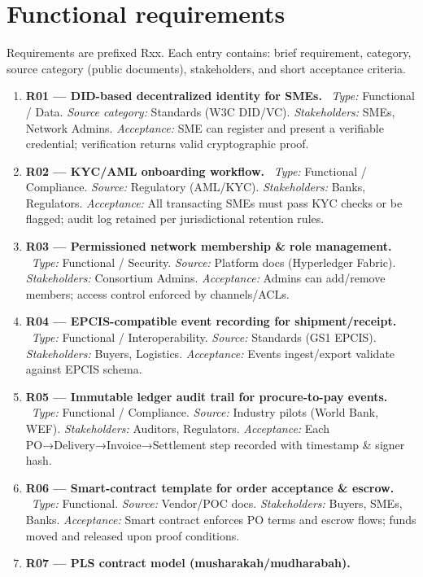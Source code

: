 \documentclass[11pt,a4paper]{article}
\begin{document}
\section{Functional requirements}
\label{sec:functional}
Requirements are prefixed Rxx. Each entry contains: brief requirement, category, source category (public documents), stakeholders, and short acceptance criteria.
\begin{enumerate}[label=R\arabic*:,leftmargin=*,itemsep=6pt]
\item \textbf{R01 — DID-based decentralized identity for SMEs.} \
\textit{Type:} Functional / Data. \textit{Source category:} Standards (W3C DID/VC). \textit{Stakeholders:} SMEs, Network Admins. \textit{Acceptance:} SME can register and present a verifiable credential; verification returns valid cryptographic proof.
\item \textbf{R02 — KYC/AML onboarding workflow.} \
\textit{Type:} Functional / Compliance. \textit{Source:} Regulatory (AML/KYC). \textit{Stakeholders:} Banks, Regulators. \textit{Acceptance:} All transacting SMEs must pass KYC checks or be flagged; audit log retained per jurisdictional retention rules.
\item \textbf{R03 — Permissioned network membership \& role management.} \
\textit{Type:} Functional / Security. \textit{Source:} Platform docs (Hyperledger Fabric). \textit{Stakeholders:} Consortium Admins. \textit{Acceptance:} Admins can add/remove members; access control enforced by channels/ACLs.
\item \textbf{R04 — EPCIS-compatible event recording for shipment/receipt.} \
\textit{Type:} Functional / Interoperability. \textit{Source:} Standards (GS1 EPCIS). \textit{Stakeholders:} Buyers, Logistics. \textit{Acceptance:} Events ingest/export validate against EPCIS schema.
\item \textbf{R05 — Immutable ledger audit trail for procure-to-pay events.} \
\textit{Type:} Functional / Compliance. \textit{Source:} Industry pilots (World Bank, WEF). \textit{Stakeholders:} Auditors, Regulators. \textit{Acceptance:} Each PO→Delivery→Invoice→Settlement step recorded with timestamp \& signer hash.
\item \textbf{R06 — Smart-contract template for order acceptance \& escrow.} \
\textit{Type:} Functional. \textit{Source:} Vendor/POC docs. \textit{Stakeholders:} Buyers, SMEs, Banks. \textit{Acceptance:} Smart contract enforces PO terms and escrow flows; funds moved and released upon proof conditions.
\item \textbf{R07 — PLS contract model (musharakah/mudharabah).} \

\end{enumerate}
\end{document}
